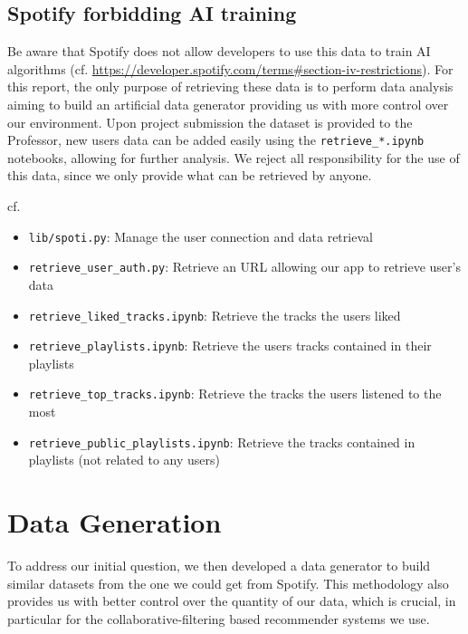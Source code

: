 \subsection{Spotify forbidding AI training} \label{subsec:law_spotify}
Be aware that Spotify does not allow developers to use this data to train AI algorithms (cf. \url{https://developer.spotify.com/terms#section-iv-restrictions}). For this report, the only purpose of retrieving these data is to perform data analysis aiming to build an artificial data generator providing us with more control over our environment. Upon project submission the dataset is provided to the Professor, new users data can be added easily using the \texttt{retrieve\_*.ipynb} notebooks, allowing for further analysis. We reject all responsibility for the use of this data, since we only provide what can be retrieved by anyone.

cf.
\begin{itemize}
    \item \texttt{lib/spoti.py}: Manage the user connection and data retrieval
    \item \texttt{retrieve\_user\_auth.py}: Retrieve an URL allowing our app to retrieve user's data
    \item \texttt{retrieve\_liked\_tracks.ipynb}: Retrieve the tracks the users liked
    \item \texttt{retrieve\_playlists.ipynb}: Retrieve the users tracks contained in their playlists
    \item \texttt{retrieve\_top\_tracks.ipynb}: Retrieve the tracks the users listened to the most
    \item \texttt{retrieve\_public\_playlists.ipynb}: Retrieve the tracks contained in playlists (not related to any users)
\end{itemize}

\setcounter{footnote}{0}%

\section{Data Generation} \label{sec:data_generation}
To address our initial question, we then developed a data generator to build similar datasets from the one we could get from Spotify. This methodology also provides us with better control over the quantity of our data, which is crucial, in particular for the collaborative-filtering based recommender systems we use.

